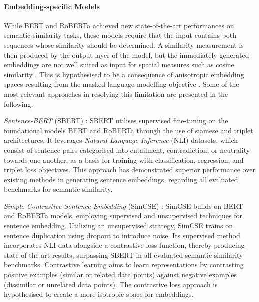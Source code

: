 \documentclass[11pt]{scrreprt}
\let\cite\parencite  %
\begin{document}


\paragraph{Embedding-specific Models} While BERT and RoBERTa achieved new state-of-the-art performances on semantic similarity tasks, these models require that the input contains both sequences whose similarity should be determined. A similarity measurement is then produced by the output layer of the model, but the immediately generated embeddings are not well suited as input for spatial measures such as cosine similarity \cite{reimersSentenceBERTSentenceEmbeddings2019}. This is hypothesised to be a consequence of anisotropic embedding spaces resulting from the masked language modelling objective \cite{liSentenceEmbeddingsPretrained2020}. Some of the most relevant approaches in resolving this limitation are presented in the following.


\textit{Sentence-BERT} (SBERT) \cite{reimersSentenceBERTSentenceEmbeddings2019}: SBERT utilises supervised fine-tuning on the foundational models BERT and RoBERTa through the use of siamese and triplet architectures. It leverages \textit{Natural Language Inference} (NLI) datasets, which consist of sentence pairs categorised into entailment, contradiction, or neutrality towards one another, as a basis for training with classification, regression, and triplet loss objectives. This approach has demonstrated superior performance over existing methods in generating sentence embeddings, regarding all evaluated benchmarks for semantic similarity. 

\textit{Simple Contrastive Sentence Embedding} (SimCSE) \cite{gaoSimCSESimpleContrastive2021}:
 SimCSE builds on BERT and RoBERTa models, employing supervised and unsupervised techniques for sentence embedding. Utilizing an unsupervised strategy, SimCSE trains on sentence duplication using dropout to introduce noise. Its supervised method incorporates NLI data alongside a contrastive loss function, thereby producing state-of-the art results, surpassing SBERT in all evaluated semantic similarity benchmarks. Contrastive learning aims to learn representations by contrasting positive examples (similar or related data points) against negative examples (dissimilar or unrelated data points). The contrastive loss approach is hypothesised to create a more isotropic space for embeddings.
\end{document}
